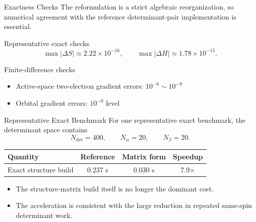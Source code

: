 \documentclass{beamer}
\newcommand{\Dfull}{N_{\mathrm{det}}}
\newcommand{\Na}{N_{\alpha}}
\newcommand{\Nb}{N_{\beta}}
\begin{document}
\begin{frame}{Exactness Checks}
  The reformulation is a strict algebraic reorganization, so numerical agreement
  with the reference determinant-pair implementation is essential.

  \begin{block}{Representative exact checks}
    \[
    \max |\Delta S| \approx 2.22\times 10^{-16},
    \qquad
    \max |\Delta H| \approx 1.78\times 10^{-15}.
    \]
  \end{block}

  \begin{block}{Finite-difference checks}
    \begin{itemize}
      \item Active-space two-electron gradient errors:
            \(10^{-8}\sim 10^{-9}\)
      \item Orbital gradient errors:
            \(10^{-9}\) level
    \end{itemize}
  \end{block}
\end{frame}

\begin{frame}{Representative Exact Benchmark}
  For one representative exact benchmark, the determinant space contains
  \[
  \Dfull = 400,\qquad \Na = 20,\qquad \Nb = 20.
  \]

  \vspace{0.5em}
  \begin{table}
    \centering
    \begin{tabular}{lccc}
      \toprule
      Quantity & Reference & Matrix form & Speedup \\
      \midrule
      Exact structure build & 0.237 s & 0.030 s & 7.9$\times$ \\
      \bottomrule
    \end{tabular}
  \end{table}

  \begin{itemize}
    \item The structure-matrix build itself is no longer the dominant cost.
    \item The acceleration is consistent with the large reduction in repeated
          same-spin determinant work.
  \end{itemize}
\end{frame}
\end{document}
